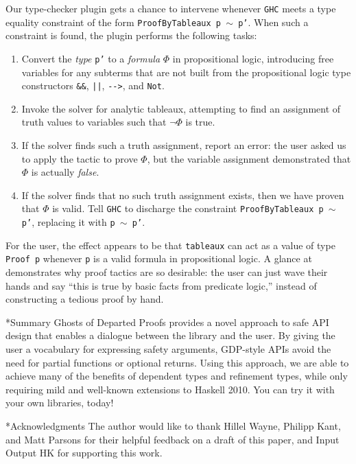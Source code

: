 \documentclass[format=sigplan, review=false, screen=true]{acmart}
\makeatletter
\let\origsection\section
\let\origsubsection\subsection
\renewcommand\section{\@ifstar{\starsection}{\nostarsection}}
\renewcommand\subsection{\@ifstar{\starsubsection}{\nostarsubsection}}
\newcommand\nostarsection[1]
{\sectionprelude\origsection{#1}\sectionpostlude}
\newcommand\starsection[1]
{\sectionprelude\origsection*{#1}\sectionpostlude}
\newcommand\nostarsubsection[1]
{\subsectionprelude\origsubsection{#1}\subsectionpostlude}
\newcommand\starsubsection[1]
{\subsectionprelude\origsubsection*{#1}\subsectionpostlude}
\newcommand\sectionprelude{%
  \vspace{-0.5em}
}
\newcommand\sectionpostlude{%
  \vspace{0em}
}
\newcommand\subsectionprelude{%
  \vspace{-0.25em}
}
\newcommand\subsectionpostlude{%
  \vspace{-0.05em}
}
\makeatother
\begin{document}
Our type-checker plugin gets a chance to intervene whenever \texttt{GHC}
meets a type equality constraint of the form \texttt{ProofByTableaux p $\sim$ p'}.
When such a constraint is found, the plugin performs the following tasks:
\begin{enumerate}
\item Convert the \emph{type} \texttt{p'} to a \emph{formula} $\Phi$ in propositional
  logic, introducing free variables for any subterms that are not built from the
  propositional logic type constructors \verb|&&|, \verb#||#, \verb|-->|, and \verb|Not|.
\item Invoke the solver for analytic tableaux, attempting to find an assignment of truth
  values to variables such that $\neg \Phi$ is true.
\item If the solver finds such a truth assignment, report an error: the user asked us
  to apply the tactic to prove $\Phi$, but the variable assignment demonstrated that
  $\Phi$ is actually \emph{false}.
\item If the solver finds that no such truth assignment exists, then we have proven that
  $\Phi$ is valid. Tell \texttt{GHC} to discharge the constraint \texttt{ProofByTableaux p $\sim$ p'}, replacing it with \texttt{p $\sim$ p'}.
\end{enumerate}
For the user, the effect appears to be that \texttt{tableaux} can act as a value of
type \texttt{Proof p} whenever \texttt{p} is a valid formula in propositional logic.
A glance at  demonstrates why proof tactics are so desirable:
the user can just wave their hands and say ``this is true by basic facts from predicate logic,''
instead of constructing a tedious proof by hand.

\section*{Summary}
Ghosts of Departed Proofs provides a novel approach to safe API design  that enables
a dialogue between the library and the user. By giving the user a vocabulary for expressing
safety arguments, GDP-style APIs avoid
the need for partial functions or optional returns. Using this approach, we are able to achieve
many of the benefits of dependent types and refinement types, while only requiring mild
and well-known extensions to Haskell 2010. 
You can try it with your own libraries, today!

\vspace{-0.4em}
\subsection*{Acknowledgments}
\vspace{-0.1em}
The author would like to thank Hillel Wayne, Philipp Kant, and Matt Parsons for
their helpful feedback on a draft of this paper, and Input Output HK for supporting
this work.
\vspace{-0.2em}




\end{document}
